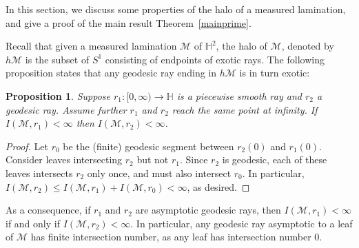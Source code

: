 \documentclass[11pt]{article} %
\theoremstyle{plain}
\newtheorem{prop}[thm]{Proposition}
\theoremstyle{definition}
\numberwithin{equation}{section}
\begin{document}
In this section, we discuss some properties of the halo of a measured lamination, and give a proof of the main result Theorem~\ref{mainprime}.

Recall that given a measured lamination $\mathcal{M}$ of $\mathbb{H}^2$, the halo of $\mathcal{M}$, denoted by $h\mathcal{M}$ is the subset of $S^1$ consisting of endpoints of exotic rays. The following proposition states that any geodesic ray ending in $h\mathcal{M}$ is in turn exotic:

\begin{prop}\label{prop:point_at_infinity}
Suppose $r_1:[0,\infty)\to \mathbb{H}$ is a piecewise smooth ray and $r_2$ a geodesic ray. Assume further $r_1$ and $r_2$ reach the same point at infinity. If $I(\mathcal{M},r_1)<\infty$ then $I(\mathcal{M},r_2)<\infty$.
\end{prop}
\begin{proof}
Let $r_0$ be the (finite) geodesic segment between $r_2(0)$ and $r_1(0)$. Consider leaves intersecting $r_2$ but not $r_1$. Since $r_2$ is geodesic, each of these leaves intersects $r_2$ only once, and must also intersect $r_0$. In particular, $I(\mathcal{M},r_2)\le I(\mathcal{M},r_1)+I(\mathcal{M},r_0)<\infty$, as desired.
\end{proof}


As a consequence, if $r_1$ and $r_2$ are asymptotic geodesic rays, then $I(\mathcal{M},r_1)<\infty$ if and only if $I(\mathcal{M},r_2)<\infty$. In particular, any geodesic ray asymptotic to a leaf of $\mathcal{M}$ has finite intersection number, as any leaf has intersection number $0$.
\end{document}
